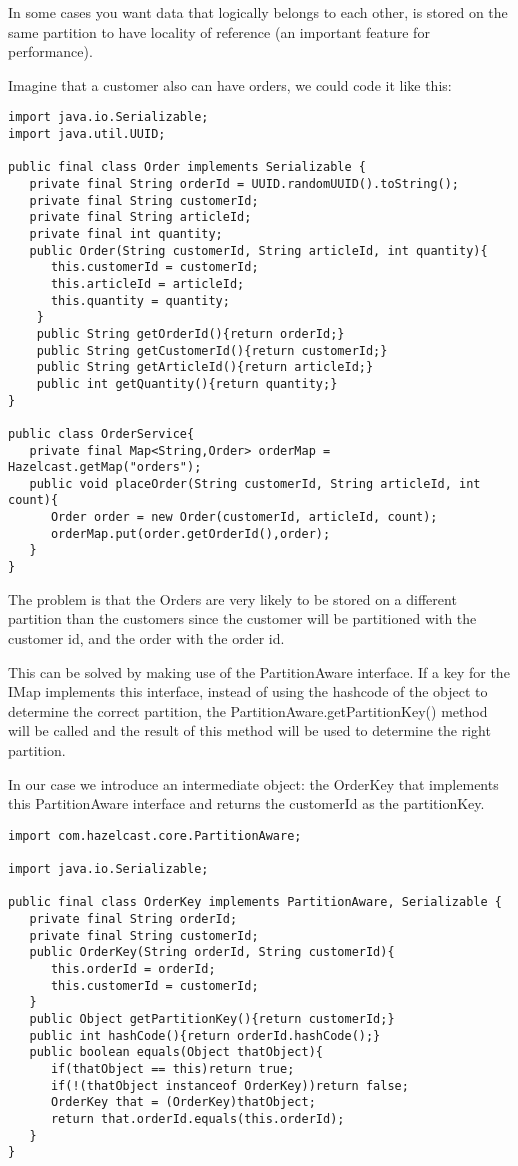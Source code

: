 In some cases you want data that logically belongs to each other, is stored on the same partition to have locality of reference (an important feature for performance). 

Imagine that a customer also can have orders, we could code it like this:

\begin{verbatim}
import java.io.Serializable;
import java.util.UUID;

public final class Order implements Serializable {
   private final String orderId = UUID.randomUUID().toString();
   private final String customerId;
   private final String articleId;
   private final int quantity;
   public Order(String customerId, String articleId, int quantity){
      this.customerId = customerId;
      this.articleId = articleId;
      this.quantity = quantity;
    }
    public String getOrderId(){return orderId;}
    public String getCustomerId(){return customerId;}
    public String getArticleId(){return articleId;}
    public int getQuantity(){return quantity;}
}

public class OrderService{
   private final Map<String,Order> orderMap = Hazelcast.getMap("orders");
   public void placeOrder(String customerId, String articleId, int count){
      Order order = new Order(customerId, articleId, count);
      orderMap.put(order.getOrderId(),order);
   }
}
\end{verbatim}

The problem is that the Orders are very likely to be stored on a different partition than the customers since the customer will be partitioned with the customer id, and the order with the order id. 

This can be solved by making use of the PartitionAware interface. If a key for the IMap implements this interface, instead of using the hashcode of the object to determine the correct partition, the PartitionAware.getPartitionKey() method will be called and the result of this method will be used to determine the right partition.

In our case we introduce an intermediate object: the OrderKey that implements this PartitionAware interface and returns the customerId as the partitionKey.

\begin{verbatim}
import com.hazelcast.core.PartitionAware;

import java.io.Serializable;

public final class OrderKey implements PartitionAware, Serializable {
   private final String orderId;
   private final String customerId;
   public OrderKey(String orderId, String customerId){
      this.orderId = orderId;
      this.customerId = customerId;
   }
   public Object getPartitionKey(){return customerId;}
   public int hashCode(){return orderId.hashCode();}
   public boolean equals(Object thatObject){
      if(thatObject == this)return true;
      if(!(thatObject instanceof OrderKey))return false;
      OrderKey that = (OrderKey)thatObject;
      return that.orderId.equals(this.orderId);
   }
}
\end{verbatim}

